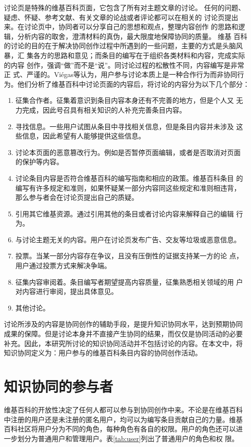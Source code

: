 讨论页是特殊的维基百科页面，它包含了所有对主题文章的讨论。
任何的问题、疑虑、怀疑、参考文献、有关文章的论战或者评论都可以在相关的
讨论页提出来。在讨论页中，协同者可以分享自己的思想和观点，整理内容创作
的思路和逻辑，分析内容的取舍，澄清材料的真伪，最大限度地保障协同的质量。
维基
百科的讨论的目的在于解决协同创作过程中所遇到的一些问题，主要的方式是头脑风暴，汇
集各方的思路和意见；而条目的编写在于组织各类材料和内容，完成实际的内容
创作，强调“做”而不是“说”。同讨论过程的松散性不同，内容编写是非常正
式、严谨的。Viégas等认为，用户参与讨论本质上是一种合作行为而非协同行
为\cite{985765}。他们分析了维基百科中讨论页面的内容后，将讨论的内容分为以下几个部分：
\begin{enumerate}
\item 征集合作者。征集着意识到条目内容本身还有不完善的地方，但是个人又
  无力完成，因此号召具有相关知识的人补充完善条目内容。
\item 寻找信息。一些用户试图从条目中寻找相关信息，但是条目内容并未涉及
  这些信息，因此希望有人能够提供这些信息。
\item 讨论本页面的恶意篡改行为。例如是否暂停页面编辑，或者是否取消对页面
  的保护等内容。
\item 讨论条目内容是否符合维基百科的编写指南和相应的政策。维基百科条目
  的编写有许多规定和准则，如果怀疑某一部分内容同这些规定和准则相违背，
  那么参与者会在讨论页提出自己的质疑。
\item 引用其它维基资源。通过引用其他的条目或者讨论内容来解释自己的编辑
  行为。
\item 与讨论主题无关的内容。用户在讨论页发布广告、交友等垃圾或恶意信息。
\item 投票。当某一部分内容存在争议，且没有压倒性的证据支持某一方的论
  点，用户通过投票方式来解决争端。
\item 征集内容审阅着。条目编写者期望提高内容质量，征集熟悉相关领域的用
  户对内容进行审阅，提出具体意见。
\item 其他讨论。

\end{enumerate}

讨论所涉及的内容是协同创作的辅助手段，是提升知识协同水平，达到预期协同
成果的保障。但是讨论本身并不直接产生协同的结果，而仅仅是协同活动的必要
补充。因此，本研究所讨论的知识协同活动并不包括讨论的内容。在本文中，将
知识协同定义为：用户参与的维基百科条目内容的协同创作活动。

\section{知识协同的参与者}
\label{sec:participants}
维基百科的开放性决定了任何人都可以参与到协同创作中来。不论是在维基百科
中注册的用户还是未注册的匿名用户，均可以为编写条目贡献自己的力量。维基
百科社区将用户分为不同的角色，每种角色有各自的权限。用户的角色还可以进
一步划分为普通用户和管理用户。表\ref{tab:user}列出了普通用户的角色和权
限。



